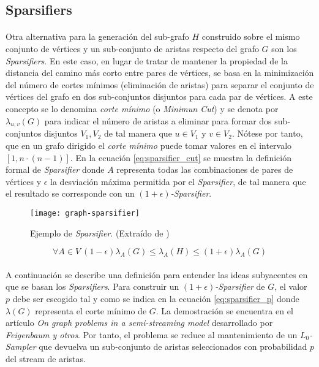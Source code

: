 \documentclass{subfiles}
\begin{document}
      \subsection{Sparsifiers}
      \label{sec:sparsifiers}

        \paragraph{}
        Otra alternativa para la generación del sub-grafo $H$ construido sobre el mismo conjunto de vértices y un sub-conjunto de aristas respecto del grafo $G$ son los \emph{Sparsifiers}. En este caso, en lugar de tratar de mantener la propiedad de la distancia del camino más corto entre pares de vértices, se basa en la minimización del número de cortes mínimos (eliminación de aristas) para separar el conjunto de vértices del grafo en dos sub-conjuntos disjuntos para cada par de vértices. A este concepto se lo denomina \emph{corte mínimo} (o \emph{Minimun Cut}) y se denota por $\lambda_{u,v}(G)$ para indicar el número de aristas a eliminar para formar dos sub-conjuntos disjuntos $V_{1}, V_{2}$ de tal manera que $u\in V_{1}$ y $v \in V_{2}$. Nótese por tanto, que en un grafo dirigido el \emph{corte mínimo} puede tomar valores en el intervalo $[1, n\cdot(n-1)]$.  En la ecuación \eqref{eq:sparsifier_cut} se muestra la definición formal de \emph{Sparsifier} donde $A$ representa todas las combinaciones de pares de vértices y $\epsilon$ la desviación máxima permitida por el \emph{Sparsifier}, de tal manera que el resultado se corresponde con un \emph{$(1 +\epsilon)$-Sparsifier}.

        \begin{figure}
          \centering
          \texttt{[image: graph-sparsifier]}
          \caption{Ejemplo de \emph{Sparsifier}. (Extraído de \cite{harvey2011randomized})}
          \label{img:graph_community_structure}
        \end{figure}

        \begin{equation}
        \label{eq:sparsifier_cut}
          \forall A \in V \  (1-\epsilon)\lambda_A(G)\leq\lambda_A(H)\leq(1+\epsilon)\lambda_A(G)
        \end{equation}

        \paragraph{}
        A continuación se describe una definición para entender las ideas subyacentes en que se basan los \emph{Sparsifiers}. Para construir un \emph{$(1 +\epsilon)$-Sparsifier} de $G$, el valor $p$ debe ser escogido tal y como se indica en la ecuación \eqref{eq:sparsifier_p} donde $\lambda(G)$ representa el corte mínimo de $G$. La demostración se encuentra en el artículo \emph{On graph problems in a semi-streaming model} \cite{feigenbaum2005graph} desarrollado por \emph{Feigenbaum y otros}. Por tanto, el problema se reduce al mantenimiento de un \emph{$L_{0}$-Sampler} que devuelva un sub-conjunto de aristas seleccionados con probabilidad $p$ del stream de aristas.
\end{document}
